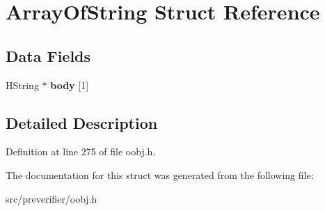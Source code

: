 \section{ArrayOfString Struct Reference}
\label{struct_array_of_string}
\subsection*{Data Fields}
\begin{DoxyCompactItemize}
\item 
HString $\ast$ {\bfseries body} [1]\label{struct_array_of_string_a4172eee8d0f4aaf73c874f35b700036f}

\end{DoxyCompactItemize}


\subsection{Detailed Description}


Definition at line 275 of file oobj.h.



The documentation for this struct was generated from the following file:\begin{DoxyCompactItemize}
\item 
src/preverifier/oobj.h\end{DoxyCompactItemize}
